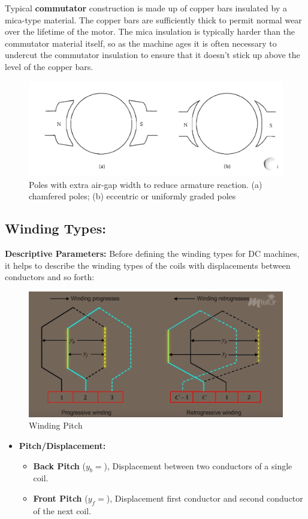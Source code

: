 \documentclass{book}
\begin{document}
Typical \textbf{commutator} construction is made up of copper bars insulated by a mica-type material. The copper bars are sufficiently thick to permit normal wear over the lifetime of the motor. The mica insulation is typically harder than the commutator material itself, so as the machine ages it is often necessary to undercut the commutator insulation to ensure that it doesn't stick up above the level of the copper bars. 


\begin{figure}[h]
	\centering
	\includegraphics[width=0.4\linewidth]{Screenshots/pole_armature_geometry}
	\caption{Poles with extra air-gap width to reduce armature reaction. (a) chamfered poles; (b) eccentric or uniformly graded poles}
	\label{fig:polearmaturegeometry}
\end{figure}

\subsection{Winding Types:}

\textbf{Descriptive Parameters:} Before defining the winding types for DC machines, it helps to describe the winding types of the coils with displacements between conductors and so forth:
\begin{figure}[h]
	\centering
	\includegraphics[width=0.4\linewidth]{Screenshots/pitch}
	\caption{Winding Pitch}
	\label{fig:pitch}
\end{figure}


\begin{itemize}
	\item \textbf{Pitch/Displacement:}
	\begin{itemize}
		\item \textbf{Back Pitch} ($y_b= $), Displacement between two conductors of a single coil.
		\item \textbf{Front Pitch} ($y_f=$), Displacement first conductor and second conductor of the next coil.
	\end{itemize}
\end{itemize}
\end{document}
